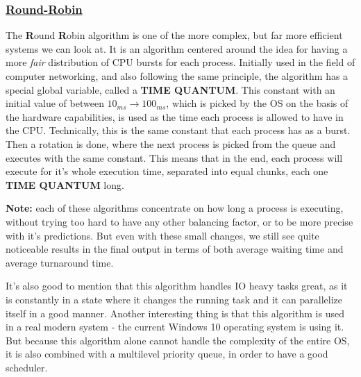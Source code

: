 \documentclass{article}
\begin{document}
\subsubsection{\underline{Round-Robin}}

The \textbf{R}ound \textbf{R}obin algorithm is one of the more complex, but far more efficient systems we can look at. It is an algorithm centered around the idea for having a more \textit{fair} distribution of CPU bursts for each process. Initially used in the field of computer networking, and also following the same principle, the algorithm has a special global variable, called a \textbf{TIME QUANTUM}. This constant with an initial value of between $10_{ms} \to 100_{ms}$, which is picked by the OS on the basis of the hardware capabilities, is used as the time each process is allowed to have in the CPU. Technically, this is the same constant that each process has as a burst. Then a rotation is done, where the next process is picked from the queue and executes with the same constant. This means that in the end, each process will execute for it's whole execution time, separated into equal chunks, each one \textbf{TIME QUANTUM} long.

\textbf{Note:} each of these algorithms concentrate on how long a process is executing, without trying too hard to have any other balancing factor, or to be more precise with it's predictions. But even with these small changes, we still see quite noticeable results in the final output in terms of both average waiting time and average turnaround time.

It's also good to mention that this algorithm handles IO heavy tasks great, as it is constantly in a state where it changes the running task and it can parallelize itself in a good manner. Another interesting thing is that this algorithm is used in a real modern system - the current Windows 10 operating system is using it. But because this algorithm alone cannot handle the complexity of the entire OS, it is also combined with a multilevel priority queue, in order to have a good scheduler.
\end{document}
